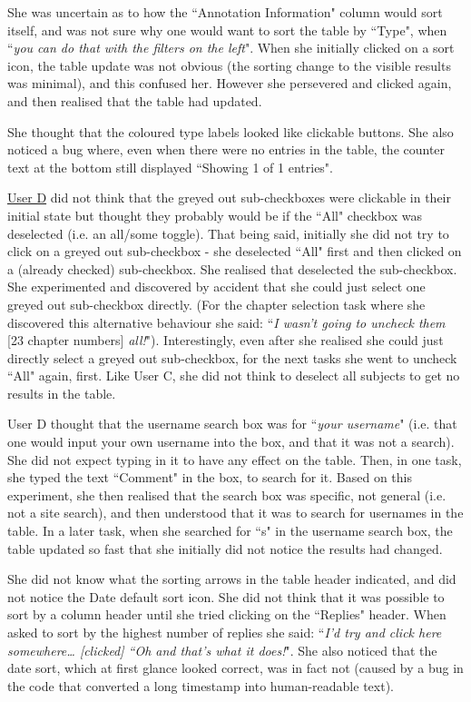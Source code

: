 She was uncertain as to how the ``Annotation Information" column would sort itself, and was not sure why one would want to sort the table by ``Type", when ``\textit{you can do that with the filters on the left}". When she initially clicked on a sort icon, the table update was not obvious (the sorting change to the visible results was minimal), and this confused her. However she persevered and clicked again, and then realised that the table had updated. 

She thought that the coloured type labels looked like clickable buttons. She also noticed a bug where, even when there were no entries in the table, the counter text at the bottom still displayed ``Showing 1 of 1 entries".

\underline{User D} did not think that the greyed out sub-checkboxes were clickable in their initial state but thought they probably would be if the ``All" checkbox was deselected (i.e. an all/some toggle). That being said, initially she did not try to click on a greyed out sub-checkbox - she deselected ``All" first and then clicked on a (already checked) sub-checkbox. She realised that deselected the sub-checkbox. She experimented and discovered by accident that she could just select one greyed out sub-checkbox directly. (For the chapter selection task where she discovered this alternative behaviour she said: ``\textit{I wasn't going to uncheck them} [23 chapter numbers] \textit{all!}"). Interestingly, even after she realised she could just directly select a greyed out sub-checkbox, for the next tasks she went to uncheck ``All" again, first. Like User C, she did not think to deselect all subjects to get no results in the table. 

User D thought that the username search box was for ``\textit{your username}" (i.e. that one would input your own username into the box, and that it was not a search). She did not expect typing in it to have any effect on the table. Then, in one task, she typed the text ``Comment" in the box, to search for it. Based on this experiment, she then realised that the search box was specific, not general (i.e. not a site search), and then understood that it was to search for usernames in the table. In a later task, when she searched for ``s" in the username search box, the table updated so fast that she initially did not notice the results had changed.

She did not know what the sorting arrows in the table header indicated, and did not notice the Date default sort icon. She did not think that it was possible to sort by a column header until she tried clicking on the ``Replies" header. When asked to sort by the highest number of replies she said: ``\textit{I'd try and click here somewhere… [clicked] ``Oh and that's what it does!}". She also noticed that the date sort, which at first glance looked correct, was in fact not (caused by a bug in the code that converted a long timestamp into human-readable text). 

